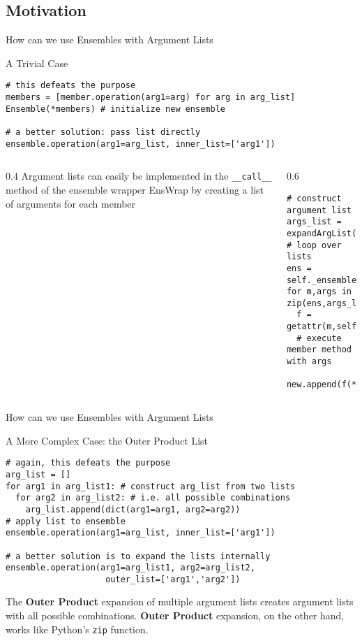 \documentclass[hyperref={pdfpagelabels=false},compress,final]{beamer}
\newenvironment{myBox}[3][shadow=true]%
{\begin{center} \begin{minipage}{#2} \begin{beamerboxesrounded}[#1]{#3} \smallskip}%
      {\smallskip \end{beamerboxesrounded} \end{minipage} \end{center}}
\newenvironment{myCode}[3][shadow=true]%
{\begin{center} \begin{minipage}{#2} \begin{beamerboxesrounded}[#1]{#3}}%
      {\end{beamerboxesrounded} \end{minipage} \end{center}}
\begin{document}
\subsection*{Motivation}

\begin{frame}[fragile=singleslide]{How can we use Ensembles with Argument Lists}
  \begin{myCode}{\textwidth}{A Trivial Case}
    \footnotesize
    \begin{verbatim}
# this defeats the purpose
members = [member.operation(arg1=arg) for arg in arg_list]
Ensemble(*members) # initialize new ensemble
    
# a better solution: pass list directly
ensemble.operation(arg1=arg_list, inner_list=['arg1'])
    \end{verbatim}
  \end{myCode}
  \bigskip
  
  \begin{columns}
    \begin{column}{0.4\textwidth}
    Argument lists can easily be implemented in the \texttt{\_\_call\_\_} method of the ensemble wrapper EnsWrap by creating a list of arguments for each member
    \end{column}
    \begin{column}{0.6\textwidth}
      \vspace*{-1.cm}
      \begin{myBox}{1.\textwidth}{}
        \small
        \begin{verbatim}
# construct argument list
args_list = expandArgList(**kwargs)
# loop over lists
ens = self._ensemble
for m,args in zip(ens,args_list):
  f = getattr(m,self.attr)
  # execute member method with args
  new.append(f(**args))      
        \end{verbatim}
      \end{myBox}
    \end{column}
  \end{columns}
\end{frame}


\begin{frame}[fragile=singleslide]{How can we use Ensembles with Argument Lists}
  \begin{myCode}{\textwidth}{A More Complex Case: the Outer Product List}
    \footnotesize
    \begin{verbatim}
# again, this defeats the purpose
arg_list = []
for arg1 in arg_list1: # construct arg_list from two lists
  for arg2 in arg_list2: # i.e. all possible combinations 
    arg_list.append(dict(arg1=arg1, arg2=arg2))
# apply list to ensemble
ensemble.operation(arg1=arg_list, inner_list=['arg1'])

# a better solution is to expand the lists internally
ensemble.operation(arg1=arg_list1, arg2=arg_list2, 
                    outer_list=['arg1','arg2'])
    \end{verbatim}
  \end{myCode}
  \myskip
  The \textbf{Outer Product} expansion of multiple argument lists creates argument lists with all possible combinations.
  \textbf{Outer Product} expansion, on the other hand, works like Python's \texttt{zip} function.
\end{frame}
\end{document}
